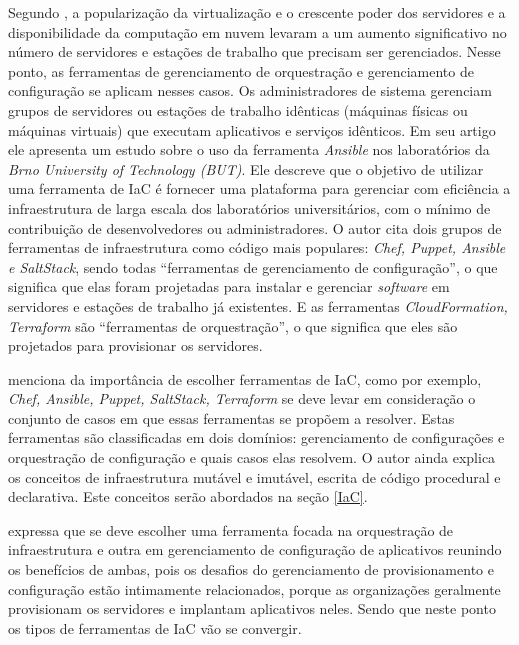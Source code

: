 \hfill

Segundo , a popularização da virtualização e o crescente poder dos servidores e a disponibilidade da computação em nuvem levaram a um aumento significativo no número de servidores e estações de trabalho que precisam ser gerenciados. Nesse ponto, as ferramentas de gerenciamento de orquestração e gerenciamento de configuração se aplicam nesses casos. Os administradores de sistema gerenciam grupos de servidores ou estações de trabalho idênticas (máquinas físicas ou máquinas virtuais) que executam aplicativos e serviços idênticos. Em seu artigo ele apresenta um estudo sobre o uso da ferramenta \textit{Ansible} nos laboratórios da \textit{Brno University of Technology (BUT)}. Ele descreve que o objetivo de utilizar uma ferramenta de IaC é fornecer uma plataforma para gerenciar com eficiência a infraestrutura de larga escala dos laboratórios universitários, com o mínimo de contribuição de desenvolvedores ou administradores.
O autor cita dois grupos de ferramentas de infraestrutura como código mais populares: \textit{Chef, Puppet, Ansible e SaltStack}, sendo todas “ferramentas de gerenciamento de configuração”, o que significa que elas foram projetadas para instalar e gerenciar \textit{software} em servidores e estações de trabalho já existentes. E as ferramentas \textit{CloudFormation, Terraform} são “ferramentas de orquestração”, o que significa que eles são projetados para provisionar os servidores.

\hfill

  menciona da importância de escolher ferramentas de IaC, como por exemplo, \textit{ Chef, Ansible, Puppet, SaltStack, Terraform } se deve levar em consideração o conjunto de casos em que essas ferramentas se propõem a resolver. Estas ferramentas são classificadas em dois domínios: gerenciamento de configurações e orquestração de configuração e quais casos elas resolvem. O autor ainda explica os conceitos de infraestrutura mutável e imutável, escrita de código procedural e declarativa. Este conceitos serão abordados na seção \ref{IaC}. 

 expressa que se deve escolher uma ferramenta focada na orquestração de infraestrutura e outra em gerenciamento de configuração de aplicativos reunindo os benefícios de ambas, pois os desafios do gerenciamento de provisionamento e configuração estão intimamente relacionados, porque as organizações geralmente provisionam os servidores e implantam aplicativos neles. Sendo que neste ponto os tipos de ferramentas de IaC vão se convergir.   

